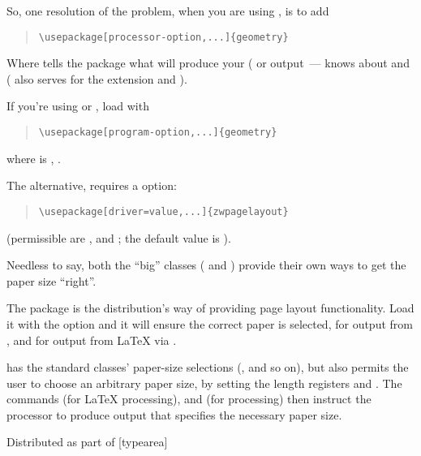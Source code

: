 So, one resolution of the problem, when you are using \latex{}, is to add
\begin{quote}
\begin{verbatim}
\usepackage[processor-option,...]{geometry}
\end{verbatim}
\end{quote}
Where  tells the package what will produce
your (\PS{} or  output~---  knows about
 and  ( also
serves for the extension  and
).

If you're using \PDFLaTeX{} or \xetex{}, load with
\begin{quote}
\begin{verbatim}
\usepackage[program-option,...]{geometry}
\end{verbatim}
\end{quote}
where  is ,
.

The alternative,  requires a 
option:
\begin{quote}
\begin{verbatim}
\usepackage[driver=value,...]{zwpagelayout}
\end{verbatim}
\end{quote}
(permissible  are , 
and ; the default value is ).

Needless to say, both the ``big'' classes ( and
) provide their own ways to get the paper size
``right''.

The  package is the 
distribution's way of providing page layout functionality.  Load it
with the  option and it will ensure the correct
paper is selected, for  output from \PDFLaTeX{}, and for
\PS{} output from \LaTeX{} via .

 has the standard classes' paper-size selections
(,  and so on), but also
permits the user to choose an arbitrary paper size, by setting the
length registers  and .  The commands
 (for \LaTeX{} processing), and 
(for \PDFLaTeX{} processing) then instruct the processor to produce
output that specifies the necessary paper size.
\begin{ctanrefs}
\item[geometry.sty]
\item[memoir.cls]
\item[typearea.sty]Distributed as part of [typearea]
\item[zwpagelayout.sty]
\end{ctanrefs}

